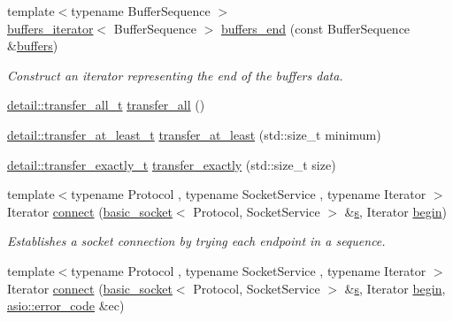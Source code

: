 \begin{DoxyCompactItemize}
{\footnotesize template$<$typename Buffer\+Sequence $>$ }\\\hyperlink{classasio_1_1buffers__iterator}{buffers\+\_\+iterator}$<$ Buffer\+Sequence $>$ \hyperlink{namespaceasio_a2ef4b181d4561848de38fac7907d4a0b}{buffers\+\_\+end} (const Buffer\+Sequence \&\hyperlink{group__async__read_ga54dede45c3175148a77fe6635222c47d}{buffers})
\begin{DoxyCompactList}\small\item\em Construct an iterator representing the end of the buffers\textquotesingle{} data. \end{DoxyCompactList}\item 
\hyperlink{classasio_1_1detail_1_1transfer__all__t}{detail\+::transfer\+\_\+all\+\_\+t} \hyperlink{group__completion__condition_ga4a82e92df79aa8401a8bc2117d4cf900}{transfer\+\_\+all} ()
\item 
\hyperlink{classasio_1_1detail_1_1transfer__at__least__t}{detail\+::transfer\+\_\+at\+\_\+least\+\_\+t} \hyperlink{group__completion__condition_ga2b10af704afcd6c7ed7f0d3b740033ef}{transfer\+\_\+at\+\_\+least} (std\+::size\+\_\+t minimum)
\item 
\hyperlink{classasio_1_1detail_1_1transfer__exactly__t}{detail\+::transfer\+\_\+exactly\+\_\+t} \hyperlink{group__completion__condition_gadb2ada9400d78a5df0e5f65dd2b9967e}{transfer\+\_\+exactly} (std\+::size\+\_\+t size)
\item 
{\footnotesize template$<$typename Protocol , typename Socket\+Service , typename Iterator $>$ }\\Iterator \hyperlink{group__connect_ga29acd61d7a875cef7dbd1f892be2906c}{connect} (\hyperlink{classasio_1_1basic__socket}{basic\+\_\+socket}$<$ Protocol, Socket\+Service $>$ \&\hyperlink{group__async__connect_ga31ab74b9ea6c77932dddd016cfc7920a}{s}, Iterator \hyperlink{group__async__connect_ga7055bca9225050c030c19c7dc926fa53}{begin})
\begin{DoxyCompactList}\small\item\em Establishes a socket connection by trying each endpoint in a sequence. \end{DoxyCompactList}\item 
{\footnotesize template$<$typename Protocol , typename Socket\+Service , typename Iterator $>$ }\\Iterator \hyperlink{group__connect_ga1bb975e78fb1233032ba2b13a229cc8e}{connect} (\hyperlink{classasio_1_1basic__socket}{basic\+\_\+socket}$<$ Protocol, Socket\+Service $>$ \&\hyperlink{group__async__connect_ga31ab74b9ea6c77932dddd016cfc7920a}{s}, Iterator \hyperlink{group__async__connect_ga7055bca9225050c030c19c7dc926fa53}{begin}, \hyperlink{classasio_1_1error__code}{asio\+::error\+\_\+code} \&ec)

\end{DoxyCompactItemize}
